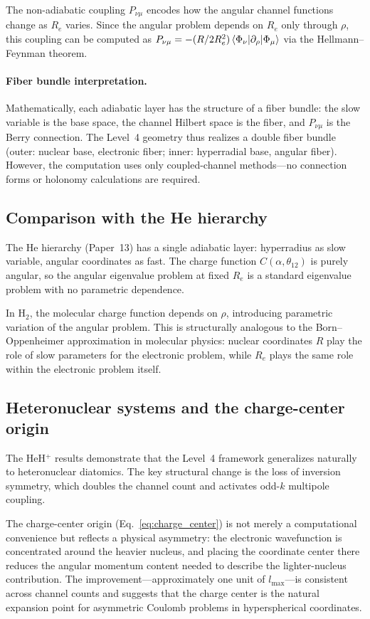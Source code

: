 \documentclass[aps,pra,twocolumn,superscriptaddress,longbibliography]{revtex4-2}
\begin{document}
\medskip
\noindent
The non-adiabatic coupling $P_{\nu\mu}$ encodes how the angular
channel functions change as $R_e$ varies.  Since the angular problem
depends on $R_e$ only through $\rho$, this coupling can be computed
as $P_{\nu\mu} = -(R/2R_e^2)\braket{\Phi_\nu|\partial_\rho|\Phi_\mu}$
via the Hellmann--Feynman theorem.

\paragraph{Fiber bundle interpretation.}
Mathematically, each adiabatic layer has the structure of a fiber
bundle: the slow variable is the base space, the channel Hilbert
space is the fiber, and $P_{\nu\mu}$ is the Berry connection.  The
Level~4 geometry thus realizes a double fiber bundle (outer: nuclear
base, electronic fiber; inner: hyperradial base, angular fiber).
However, the computation uses only coupled-channel methods---no
connection forms or holonomy calculations are required.

\subsection{Comparison with the He hierarchy}

The He hierarchy (Paper~13) has a single adiabatic layer: hyperradius
as slow variable, angular coordinates as fast.  The charge function
$C(\alpha,\theta_{12})$ is purely angular, so the angular eigenvalue
problem at fixed $R_e$ is a standard eigenvalue problem with no
parametric dependence.

In H$_2$, the molecular charge function depends on $\rho$, introducing
parametric variation of the angular problem.  This is structurally
analogous to the Born--Oppenheimer approximation in molecular physics:
nuclear coordinates $R$ play the role of slow parameters for the
electronic problem, while $R_e$ plays the same role within the
electronic problem itself.

\subsection{Heteronuclear systems and the charge-center origin}

The HeH$^+$ results demonstrate that the Level~4 framework
generalizes naturally to heteronuclear diatomics.  The key
structural change is the loss of inversion symmetry, which doubles
the channel count and activates odd-$k$ multipole coupling.

The charge-center origin (Eq.~\ref{eq:charge_center}) is not merely
a computational convenience but reflects a physical asymmetry: the
electronic wavefunction is concentrated around the heavier nucleus,
and placing the coordinate center there reduces the angular momentum
content needed to describe the lighter-nucleus contribution.
The improvement---approximately one unit of $l_{\max}$---is
consistent across channel counts and suggests that the charge
center is the natural expansion point for asymmetric Coulomb
problems in hyperspherical coordinates.
\end{document}
